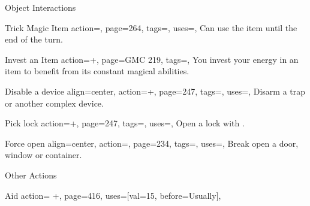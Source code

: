 \begin{PageBackLandscape}
\begin{TablesHalf}{\backTableHeight}
\begin{Table}{Object Interactions}
\begin{entry}{Trick Magic Item}{%
                action=\!,
                page=264,
                tags=\Manipulate,
                uses={\MagicalSkill[tags={T}]\Feat},
            }
                Can use the item until the end of the turn.\hfill{}
            \end{entry}
            \begin{entry}{Invest an Item}{%
                action=+,
                page=GMC 219,
                tags=\Manipulate,
            }
                You invest your energy in an item to benefit from its constant magical abilities.\hfill
            \end{entry}
            \breakLine
            \begin{entry}{Disable a device}{%
                align=center,
                action=+,
                page=247,
                tags=\Manipulate,
                uses={\Thievery[tags={T}]},
            }
                Disarm a trap or another complex device. \hfill {}\\
                \hfill
            \end{entry}
            \begin{entry}{Pick lock}{%
                action=+,
                page=247,
                tags=\Manipulate,
                uses={\Thievery[tags={T}]},
            }
                Open a lock with . \hfill{}\;
            \end{entry}
            \begin{entry}{Force open}{%
                align=center,
                action=,
                page=234,
                tags=\Attack,
                uses=\Athletics,
            }
                Break open a door, window or container. \hfill{}\\
                \hfill
            \end{entry}
        \end{Table}%
        \TableSpace
        \begin{Table}{Other Actions}
            \begin{entry}{Aid}{%
                action= +,
                page=416,
                uses={[val=15, before=Usually]},
            }

\end{entry}
\end{Table}
\end{TablesHalf}
\end{PageBackLandscape}
